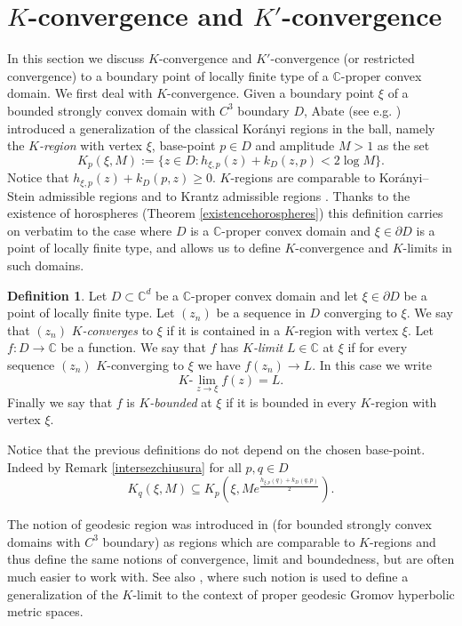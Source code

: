 \documentclass[11pt, reqno]{amsart}
\numberwithin{equation}{section}
\theoremstyle{definition}
\newtheorem{definition}[theorem]{Definition}
\newcommand{\C}{\mathbb{C}}
\begin{document}
{		\section{$K$-convergence and $K'$-convergence}
		In this section we discuss $K$-convergence and $K'$-convergence (or restricted convergence)  to a boundary point of locally finite type of a $\C$-proper convex domain. We first deal with $K$-convergence.
		Given a boundary point $\xi$ of a  bounded strongly convex domain with $C^3$ boundary $D$,
		Abate (see e.g. \cite{Abatebook}) introduced a generalization of the classical Kor\'anyi regions in the ball, namely the {\sl $K$-region} with vertex $\xi$, base-point $p\in D$ and amplitude $M>1$ as the set
		$$K_p(\xi,M):=\{z\in D\colon h_{\xi,p}(z)+k_D(z,p)<2\log M\}.$$
		Notice that $h_{\xi,p}(z)+k_D(p,z)\geq 0$.
		$K$-regions are comparable to Kor\'anyi--Stein admissible regions \cite{Stein,KorSte} and to Krantz admissible regions \cite{krantz}.
		Thanks to the existence of horospheres  (Theorem \ref{existencehorospheres}) this definition carries on verbatim to the case where $D$ is a $\C$-proper convex domain and $\xi\in \partial D$ is a point of locally finite type, and allows us to define $K$-convergence and $K$-limits in such domains.
		\begin{definition}
			Let $D\subset\C^d$ be a $\C$-proper convex domain and let $\xi\in\partial D$ be a point of locally finite type. Let $(z_n)$ be a sequence in $D$ converging to $\xi$. We say that  $(z_n)$ {\sl $K$-converges} to $\xi$ if it is contained in a $K$-region with vertex $\xi$. 
			Let $f\colon D\to \C$ be a function.
			We say that $f$ has {\sl $K$-limit} $L\in \C$ at $\xi$ if for every sequence $(z_n)$ $K$-converging to $\xi$ we have $f(z_n)\to L$. In this case we write $$K\textrm{-}\lim_{z\to\xi}f(z)=L.$$
			Finally we say that  $f$ is {\sl $K$-bounded} at $\xi$ if it is bounded in every $K$-region with vertex $\xi$.
		\end{definition}
		Notice that the previous definitions do not depend on the chosen base-point. Indeed by Remark \ref{intersezchiusura}	for all $p,q\in D$
		\begin{equation}\label{Kregpolo}
			K_q(\xi,M)\subseteq K_p\left(\xi,Me^{\frac{h_{\xi,p}(q)+k_D(q,p)}{2}}\right).
		\end{equation}
		
		
		
		The notion of geodesic region  was introduced in \cite{AAG} (for bounded strongly convex domains with $C^3$ boundary) as regions which are comparable to $K$-regions and  thus define the same notions of convergence, limit and boundedness, but are often much easier to work with. See also \cite{AFGG,AFGK}, where such notion is used to define a generalization of the $K$-limit  to the context of proper geodesic Gromov hyperbolic metric spaces. 
		
}
\end{document}
